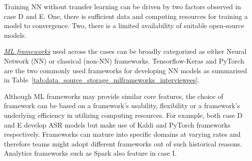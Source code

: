 Training NN without transfer learning can be driven by two factors observed in case D and E. One, there is sufficient data and computing resources for training a model to convergence. Two, there is a limited availability of suitable open-source models. %

\underline{\emph{ML frameworks}}
used across the cases can be broadly categorized as either Neural Network (NN) or classical (non-NN) frameworks. Tensorflow-Keras and PyTorch are the two commonly used frameworks for developing NN models as summarised in Table~\ref{tab:data_source_storage_mlframeworks_interviewees}.

Although ML frameworks may provide similar core features, the choice of framework can be based on a framework's usability, flexibility or a framework's underlying efficiency in utilizing computing resources. For example, both case D and E develop ASR models but make use of Kaldi and PyTorch frameworks respectively. %
Frameworks can mature into specific domains at varying rates and therefore teams might adopt different frameworks out of such historical reasons. Analytics frameworks such as Spark also feature in case I. %

